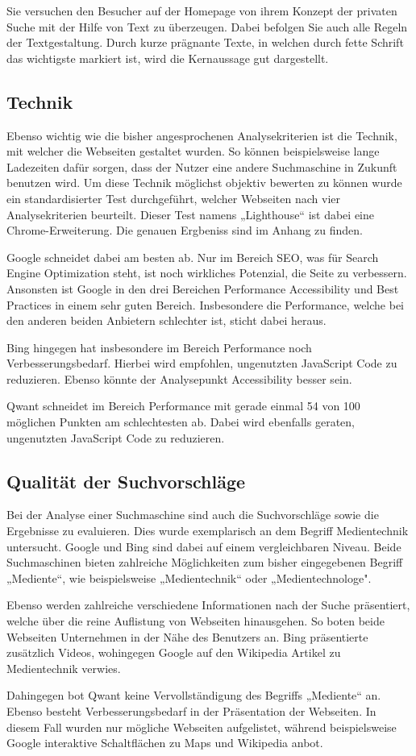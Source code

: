 Sie versuchen den Besucher auf der Homepage von ihrem Konzept der privaten Suche mit der Hilfe von
Text zu überzeugen. Dabei befolgen Sie auch alle Regeln der Textgestaltung\autocite[Seite 5ff]{Maulhardt.20220621b}. Durch kurze prägnante Texte,
in welchen durch fette Schrift das wichtigste markiert ist, wird die Kernaussage gut dargestellt.

\subsection{Technik}
Ebenso wichtig wie die bisher angesprochenen Analysekriterien ist die Technik, mit welcher die Webseiten gestaltet wurden.
So können beispielsweise lange Ladezeiten dafür sorgen, dass der Nutzer eine andere Suchmaschine in Zukunft benutzen wird.
Um diese Technik möglichst objektiv bewerten zu können wurde ein standardisierter Test durchgeführt, welcher Webseiten nach
vier Analysekriterien beurteilt. Dieser Test namens „Lighthouse“ ist dabei eine Chrome-Erweiterung. Die genauen Ergbeniss
sind im Anhang zu finden.

Google schneidet dabei am besten ab. Nur im Bereich SEO, was für Search Engine Optimization steht, ist noch wirkliches
Potenzial, die Seite zu verbessern. Ansonsten ist Google in den drei Bereichen Performance Accessibility und Best Practices
in einem sehr guten Bereich. Insbesondere die Performance, welche bei den anderen beiden Anbietern schlechter ist,
sticht dabei heraus.

Bing hingegen hat insbesondere im Bereich Performance noch Verbesserungsbedarf. Hierbei wird empfohlen, ungenutzten JavaScript
Code zu reduzieren. Ebenso könnte der Analysepunkt Accessibility besser sein.

Qwant schneidet im Bereich Performance mit gerade einmal 54 von 100 möglichen Punkten am schlechtesten ab. Dabei wird ebenfalls
geraten, ungenutzten JavaScript Code zu reduzieren.

\subsection{Qualität der Suchvorschläge}
Bei der Analyse einer Suchmaschine sind auch die Suchvorschläge sowie die Ergebnisse zu evaluieren. Dies wurde exemplarisch
an dem Begriff Medientechnik untersucht. Google und Bing sind dabei auf einem vergleichbaren Niveau. Beide Suchmaschinen
bieten zahlreiche Möglichkeiten zum bisher eingegebenen Begriff „Mediente“, wie beispielsweise „Medientechnik“ oder „Medientechnologe".

Ebenso werden zahlreiche verschiedene Informationen nach der Suche präsentiert, welche über die reine Auflistung von Webseiten
hinausgehen. So boten beide Webseiten Unternehmen in der Nähe des Benutzers an. Bing präsentierte zusätzlich Videos, wohingegen
Google auf den Wikipedia Artikel zu Medientechnik verwies.

Dahingegen bot Qwant keine Vervollständigung des Begriffs „Mediente“ an. Ebenso besteht Verbesserungsbedarf in der Präsentation
der Webseiten. In diesem Fall wurden nur mögliche Webseiten aufgelistet, während beispielsweise Google
interaktive Schaltflächen zu Maps und Wikipedia anbot.